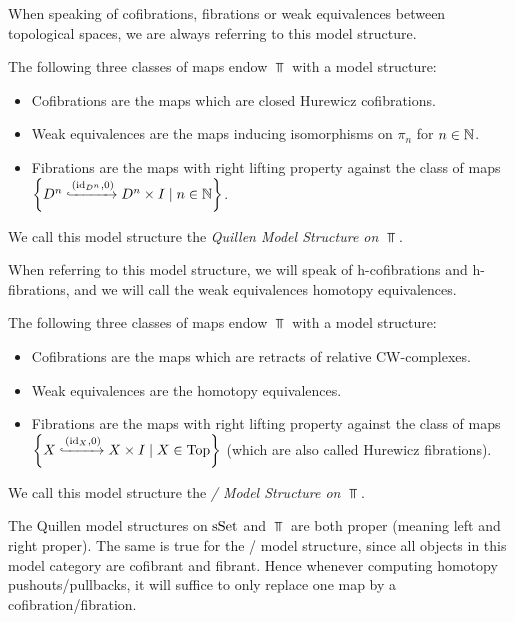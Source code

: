 When speaking of cofibrations, fibrations or weak equivalences between topological spaces, we are always referring to this model structure.
\begin{prop}
    The following three classes of maps endow $\Top$ with a model structure:
    \begin{itemize}
        \item Cofibrations are the maps which are closed Hurewicz cofibrations. %
        \item Weak equivalences are the maps inducing isomorphisms on $\pi_n$ for $n\in\mathbb{N}$.
        \item Fibrations are the maps with right lifting property against the class of maps $\left\lbrace D^n\xhookrightarrow{\left(\text{id}_{D^n},0\right)}D^n\times I\mid n\in\mathbb{N}\right\rbrace$.
    \end{itemize}
    We call this model structure the \emph{Quillen Model Structure on $\Top$}.
\end{prop}
When referring to this model structure, we will speak of h-cofibrations and h-fibrations, and we will call the weak equivalences homotopy equivalences.
\begin{prop}
    The following three classes of maps endow $\Top$ with a model structure:
    \begin{itemize}
        \item Cofibrations are the maps which are retracts of relative CW-complexes. %
        \item Weak equivalences are the homotopy equivalences.
        \item Fibrations are the maps with right lifting property against the class of maps $\left\lbrace X\xhookrightarrow{\left(\text{id}_{X},0\right)}X\times I\mid X\in\operatorname{Top}\right\rbrace$ (which are also called Hurewicz fibrations).
    \end{itemize}
    We call this model structure the \emph{\Strom/ Model Structure on $\Top$}.
\end{prop}
\begin{remark}[Properness]
    The Quillen model structures on $\operatorname{sSet}$ and $\Top$ are both proper (meaning left and right proper).
    The same is true for the \Strom/ model structure, since all objects in this model category are cofibrant and fibrant.
    Hence whenever computing homotopy pushouts/pullbacks, it will suffice to only replace one map by a cofibration/fibration.
\end{remark}
